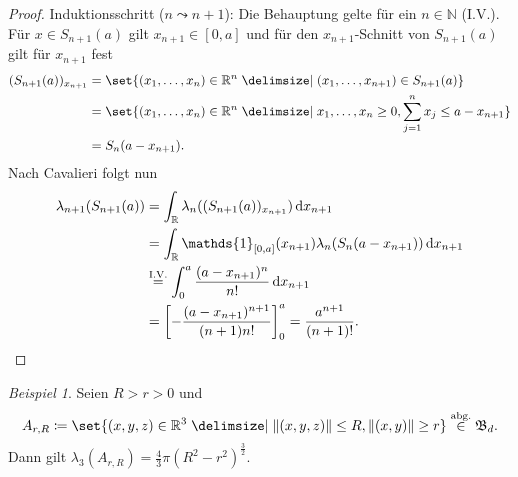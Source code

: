 \documentclass[a4paper, parskip=half]{scrartcl}
\theoremstyle{definition}
\theoremstyle{remark}
\newtheorem{beispiel}{Beispiel}
\begin{document}
\begin{proof}
		Induktionsschritt ($n\leadsto n+1$): Die Behauptung gelte für ein $n\in\mathbb{N}$ (I.V.).
		Für $x\in S_{n+1}(a)$ gilt $x_{n+1}\in[0, a]$ und für den $x_{n+1}$-Schnitt von $S_{n+1}(a)$
		gilt für $x_{n+1}$ fest
		\begin{align*}
			(S_{n+1}(a))_{x_{n+1}} &= \set{(x_1,\ldots,x_n)\in\mathbb{R}^n\given (x_1,\ldots,x_{n+1})\in S_{n+1}(a)}\\
				&= \set{(x_1,\ldots,x_n)\in\mathbb{R}^n\given x_1,\ldots,x_n\geq 0, \sum_{j=1}^n x_j\leq a-x_{n+1}}\\
				&= S_n(a-x_{n+1}).
		\end{align*}
		Nach Cavalieri folgt nun
		\begin{align*}
			\lambda_{n+1}(S_{n+1}(a)) &= \int_\mathbb{R} \lambda_n((S_{n+1}(a))_{x_{n+1}})\dd{x_{n+1}}\\
				&= \int_\mathbb{R}\mathds{1}_{[0, a]}(x_{n+1})\lambda_n(S_n(a-x_{n+1}))\dd{x_{n+1}}\\
				&\overset{\text{I.V.}}{=} \int_0^a\frac{(a-x_{n+1})^n}{n!}\dd{x_{n+1}}\\
				&= \left[-\frac{(a-x_{n+1})^{n+1}}{(n+1)n!}\right]_0^a = \frac{a^{n+1}}{(n+1)!}.\qedhere
		\end{align*}
	\end{proof}
	\begin{beispiel}
		Seien $R>r>0$ und
		\[
			A_{r, R}\coloneqq\set{(x, y, z)\in\mathbb{R}^3\given \norm{(x, y, z)}\leq R, \norm{(x, y)}\geq r}\overset{\text{abg.}}{\in} \mathfrak{B}_d.
		\]
		Dann gilt $\lambda_3(A_{r,R}) = \frac{4}{3}\pi(R^2-r^2)^\frac{3}{2}$.
	\end{beispiel}
\end{document}
